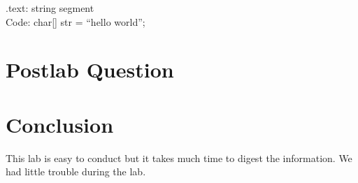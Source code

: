 \documentclass[12pt]{article}
\begin{document}
.text:		string segment \\
Code:		char[] str = “hello world”; \\

\section{Postlab Question}
\begin{table}[H]
    \centering
    \caption{SDRAM parameter.}
\end{table}

\begin{table}[H]
    \centering
    \caption{Design statistics table for the multiplier.}
\end{table}

\section{Conclusion}
This lab is easy to conduct but it takes much time to digest the information. We had little trouble during the lab. 

\newpage


\end{document}
